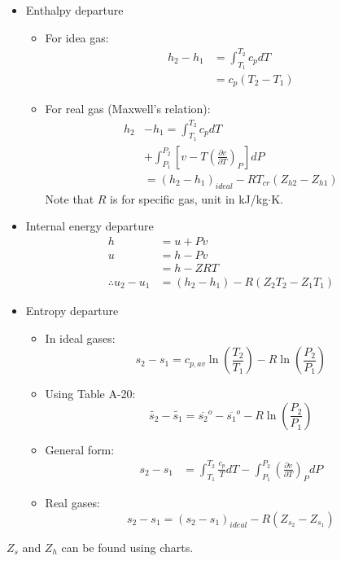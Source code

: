 \begin{itemize}
    \item Enthalpy departure
    \begin{itemize}
        \item For idea gas:
        \begin{align*}
            h_2 - h_1 &= \int_{T_1}^{T_2} c_p dT \\
            &= c_p (T_2 - T_1)
        \end{align*}
        \item For real gas (Maxwell's relation):
        \begin{align*}
            h_2 &- h_1 = \int_{T_1}^{T_2} c_p dT \\
            &+ \int_{P_1}^{P_2} \left[v - T \left(\frac{\partial v}{\partial T}\right)_P \right] dP \\
            &= (h_2 - h_1)_{ideal} - R T_{cr} (Z_{h2} - Z_{h1})
        \end{align*}
        Note that $R$ is for specific gas, unit in kJ/kg$\cdot$K.
    \end{itemize}
    \item Internal energy departure
    \begin{align*}
        h &= u + Pv \\
        u &= h - Pv \\
        &= h - ZRT \\
        \therefore u_2 - u_1 &= (h_2 - h_1) - R(Z_2 T_2 - Z_1 T_1)
    \end{align*}
    \item Entropy departure
    \begin{itemize}
        \item In ideal gases:
        \begin{equation*}
            s_2 - s_1 = c_{p,av} \ln \left(\frac{T_2}{T_1}\right) - R \ln \left(\frac{P_2}{P_1}\right)
        \end{equation*}
        \item Using Table A-20:
        \begin{equation*}
            \tilde{s_2} - \tilde{s_1} = \overline{s_2}^o - \overline{s_1}^o - R \ln \left(\frac{P_2}{P_1}\right)
        \end{equation*}
        \item General form:
        \begin{align*}
            s_2 - s_1 &= \int_{T_1}^{T_2} \frac{c_p}{T} dT - \int_{P_1}^{P_2} \left(\frac{\partial v}{\partial T}\right)_P dP
        \end{align*}
        \item Real gases:
        \begin{equation*}
            s_2 - s_1 = (s_2 -s_1)_{ideal} - R(Z_{s_2} - Z_{s_1})
        \end{equation*}
    \end{itemize}
\end{itemize}

$Z_s$ and $Z_h$ can be found using charts.